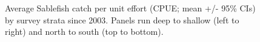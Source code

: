 \documentclass[12pt]{article}\usepackage[]{graphicx}\usepackage[]{color}
\begin{document}
\begin{figure}[htb]

{\centering {} 

}

\caption{Average Sablefish catch per unit effort (CPUE; mean +/- 95\% CIs) by survey strata since 2003. Panels run deep to shallow (left to right) and north to south (top to bottom).}\label{fig:figure6}
\end{figure}
\clearpage
\end{document}

